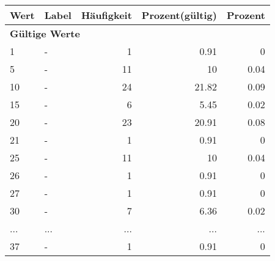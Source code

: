      \begin{longtable}{lXrrr}
     \toprule
     \textbf{Wert} & \textbf{Label} & \textbf{Häufigkeit} & \textbf{Prozent(gültig)} & \textbf{Prozent} \\
     \endhead
     \midrule
     \multicolumn{5}{l}{\textbf{Gültige Werte}}\\
        1 & \multicolumn{1}{X}{-} & %
          \num{1} &
          \num[round-mode=places,round-precision=2]{0.91} &
          \num[round-mode=places,round-precision=2]{0} \\
        5 & \multicolumn{1}{X}{-} & %
          \num{11} &
          \num[round-mode=places,round-precision=2]{10} &
          \num[round-mode=places,round-precision=2]{0.04} \\
        10 & \multicolumn{1}{X}{-} & %
          \num{24} &
          \num[round-mode=places,round-precision=2]{21.82} &
          \num[round-mode=places,round-precision=2]{0.09} \\
        15 & \multicolumn{1}{X}{-} & %
          \num{6} &
          \num[round-mode=places,round-precision=2]{5.45} &
          \num[round-mode=places,round-precision=2]{0.02} \\
        20 & \multicolumn{1}{X}{-} & %
          \num{23} &
          \num[round-mode=places,round-precision=2]{20.91} &
          \num[round-mode=places,round-precision=2]{0.08} \\
        21 & \multicolumn{1}{X}{-} & %
          \num{1} &
          \num[round-mode=places,round-precision=2]{0.91} &
          \num[round-mode=places,round-precision=2]{0} \\
        25 & \multicolumn{1}{X}{-} & %
          \num{11} &
          \num[round-mode=places,round-precision=2]{10} &
          \num[round-mode=places,round-precision=2]{0.04} \\
        26 & \multicolumn{1}{X}{-} & %
          \num{1} &
          \num[round-mode=places,round-precision=2]{0.91} &
          \num[round-mode=places,round-precision=2]{0} \\
        27 & \multicolumn{1}{X}{-} & %
          \num{1} &
          \num[round-mode=places,round-precision=2]{0.91} &
          \num[round-mode=places,round-precision=2]{0} \\
        30 & \multicolumn{1}{X}{-} & %
          \num{7} &
          \num[round-mode=places,round-precision=2]{6.36} &
          \num[round-mode=places,round-precision=2]{0.02} \\
       ... & ... & ... & ... & ... \\
        37 & \multicolumn{1}{X}{-} & %
          \num{1} &
          \num[round-mode=places,round-precision=2]{0.91} &
          \num[round-mode=places,round-precision=2]{0} \\


\end{longtable}
